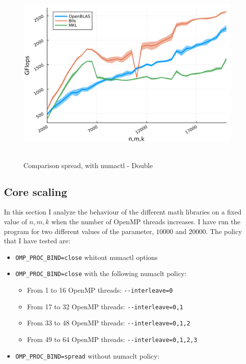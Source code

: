 \documentclass[
  letterpaper,
  DIV=11,
  numbers=noendperiod]{scrartcl}
\providecommand{\tightlist}{%
  \setlength{\itemsep}{0pt}\setlength{\parskip}{0pt}}\usepackage{longtable,booktabs,array}
\begin{document}
\begin{figure}

{\centering \includegraphics[width=\textwidth,height=3.64583in]{img/double_numactl_spread_comparison.png}

}

\caption{Comparison spread, with numactl - Double}

\end{figure}

\newpage

\hypertarget{core-scaling}{%
\subsection{Core scaling}\label{core-scaling}}

In this section I analyze the behaviour of the different math libraries
on a fixed value of \(n,m,k\) when the number of OpenMP threads
increases. I have run the program for two different values of the
parameter, \(10000\) and \(20000\). The policy that I have tested are:

\begin{itemize}
\tightlist
\item
  \texttt{OMP\_PROC\_BIND=close} whitout numactl options
\item
  \texttt{OMP\_PROC\_BIND=close} with the following numaclt policy:

  \begin{itemize}
  \tightlist
  \item
    From 1 to 16 OpenMP threads: \texttt{-\/-interleave=0}
  \item
    From 17 to 32 OpenMP threads: \texttt{-\/-interleave=0,1}
  \item
    From 33 to 48 OpenMP threads: \texttt{-\/-interleave=0,1,2}
  \item
    From 49 to 64 OpenMP threads: \texttt{-\/-interleave=0,1,2,3}
  \end{itemize}
\item
  \texttt{OMP\_PROC\_BIND=spread} without numaclt policy:
\end{itemize}
\end{document}
